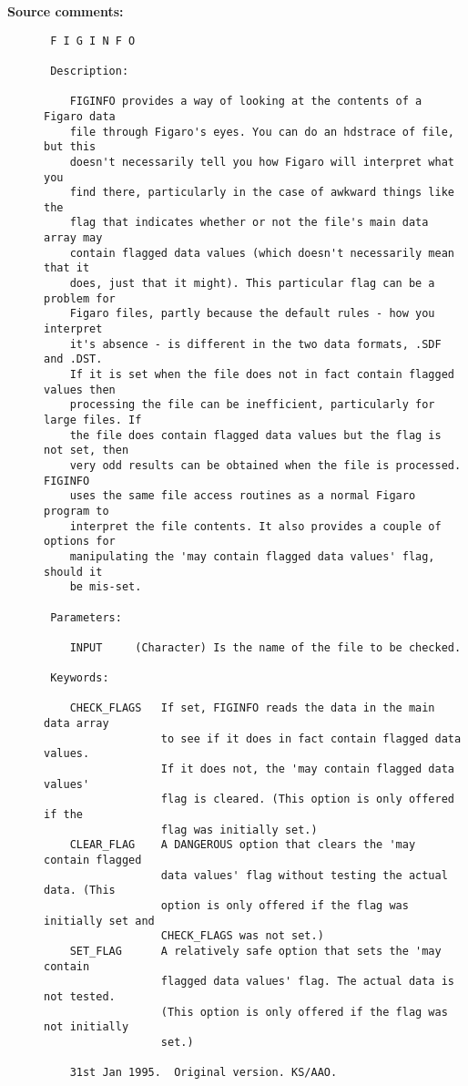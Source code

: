 \begin{description}
\item [{\bf Source comments:}]
\begin{verbatim}
 F I G I N F O

 Description:

    FIGINFO provides a way of looking at the contents of a Figaro data
    file through Figaro's eyes. You can do an hdstrace of file, but this
    doesn't necessarily tell you how Figaro will interpret what you
    find there, particularly in the case of awkward things like the
    flag that indicates whether or not the file's main data array may
    contain flagged data values (which doesn't necessarily mean that it
    does, just that it might). This particular flag can be a problem for
    Figaro files, partly because the default rules - how you interpret
    it's absence - is different in the two data formats, .SDF and .DST.
    If it is set when the file does not in fact contain flagged values then
    processing the file can be inefficient, particularly for large files. If
    the file does contain flagged data values but the flag is not set, then
    very odd results can be obtained when the file is processed. FIGINFO
    uses the same file access routines as a normal Figaro program to
    interpret the file contents. It also provides a couple of options for
    manipulating the 'may contain flagged data values' flag, should it
    be mis-set.

 Parameters:

    INPUT     (Character) Is the name of the file to be checked.

 Keywords:

    CHECK_FLAGS   If set, FIGINFO reads the data in the main data array
                  to see if it does in fact contain flagged data values.
                  If it does not, the 'may contain flagged data values'
                  flag is cleared. (This option is only offered if the
                  flag was initially set.)
    CLEAR_FLAG    A DANGEROUS option that clears the 'may contain flagged
                  data values' flag without testing the actual data. (This
                  option is only offered if the flag was initially set and
                  CHECK_FLAGS was not set.)
    SET_FLAG      A relatively safe option that sets the 'may contain
                  flagged data values' flag. The actual data is not tested.
                  (This option is only offered if the flag was not initially
                  set.)

    31st Jan 1995.  Original version. KS/AAO.
\end{verbatim}
\end{description}

